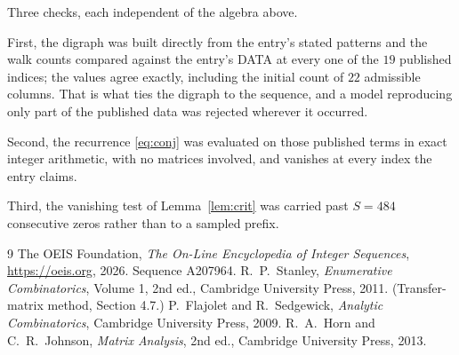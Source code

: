 \documentclass[11pt,a4paper]{article}
\theoremstyle{plain}
\theoremstyle{definition}
\begin{document}
Three checks, each independent of the algebra above.

First, the digraph was built directly from the entry's stated patterns and the walk counts
compared against the entry's DATA at every one of the $19$ published indices; the
values agree exactly, including the initial count of $22$ admissible columns. That is
what ties the digraph to the sequence, and a model reproducing only part of the published
data was rejected wherever it occurred.

Second, the recurrence \eqref{eq:conj} was evaluated on those published terms in exact
integer arithmetic, with no matrices involved, and vanishes at every index the entry claims.

Third, the vanishing test of Lemma~\ref{lem:crit} was carried past $S=484$ consecutive
zeros rather than to a sampled prefix.

\begin{thebibliography}{9}
 The OEIS Foundation, \emph{The On-Line Encyclopedia of Integer
Sequences}, \url{https://oeis.org}, 2026. Sequence A207964.
 R.~P.~Stanley, \emph{Enumerative Combinatorics}, Volume 1, 2nd ed.,
Cambridge University Press, 2011. (Transfer-matrix method, Section 4.7.)
 P.~Flajolet and R.~Sedgewick, \emph{Analytic Combinatorics}, Cambridge
University Press, 2009.
 R.~A.~Horn and C.~R.~Johnson, \emph{Matrix Analysis}, 2nd ed., Cambridge
University Press, 2013.
\end{thebibliography}
\end{document}
